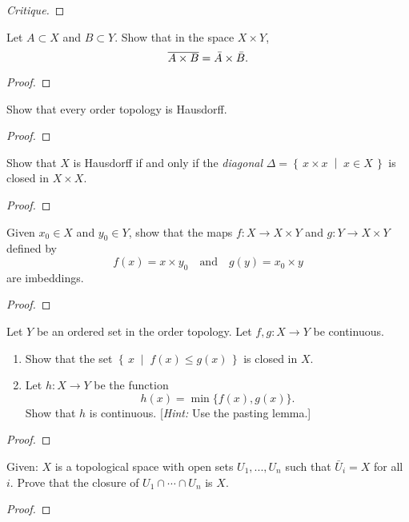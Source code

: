 \begin{proof}[Critique]
\end{proof}
\newpage
\begin{problem}[Munkres \S17, p.\,101, 9]
Let $A\subset X$ and $B\subset Y$. Show that in the space
$X\times Y$,
\[
\overline{A\times B}=\bar A\times\bar B.
\]
\end{problem}
\begin{proof}
\end{proof}
\newpage
\begin{problem}[Munkres \S17, p.\,101, 10]
Show that every order topology is Hausdorff.
\end{problem}
\begin{proof}
\end{proof}
\newpage
\begin{problem}[Munkres \S17, p.\,101, 13]
Show that $X$ is Hausdorff if and only if the \emph{diagonal}
$\Delta=\left\{\,x\times x\;\middle|\;x\in X\,\right\}$ is closed
in $X\times X$.
\end{problem}
\begin{proof}
\end{proof}
\newpage
\begin{problem}[Munkres \S18, p.\,111, 4]
Given $x_0\in X$ and $y_0\in Y$, show that the maps $f\colon X\to
X\times Y$ and $g\colon Y\to X\times Y$ defined by
\[
f(x)=x\times y_0\quad\text{and}\quad g(y)=x_0\times y
\]
are imbeddings.
\end{problem}
\begin{proof}
\end{proof}
\newpage
\begin{problem}[Munkres \S18, p.\,111-112, 8(a,b)]
Let $Y$ be an ordered set in the order topology. Let
$f,g\colon X\to Y$ be continuous.
\begin{enumerate}[noitemsep,label=(\alph*)]
\item Show that the set
  $\left\{\,x\;\middle|\;f(x)\leq g(x)\,\right\}$ is closed in $X$.
\item Let $h\colon X\to Y$ be the
  function \[h(x)=\min\{f(x),g(x)\}.\] Show that $h$ is
  continuous. [\emph{Hint:} Use the pasting lemma.]
\end{enumerate}
\end{problem}
\begin{proof}
\end{proof}
\newpage
\begin{problem}
Given: $X$ is a topological space with open sets $U_1,...,U_n$
such that $\bar U_i=X$ for all $i$. Prove that the closure of
$U_1\cap\cdots\cap U_n$ is $X$.
\end{problem}
\begin{proof}
\end{proof}

